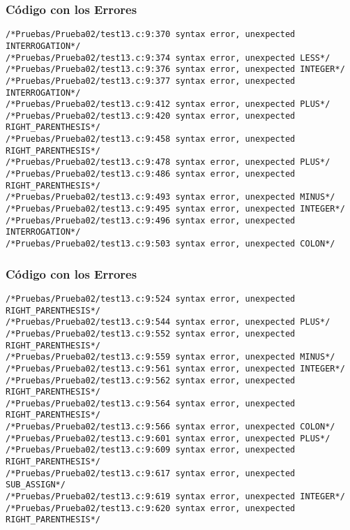 \documentclass{beamer}
\begin{document}
\begin{frame}[fragile]
\frametitle{C\'odigo con los Errores}
\begin{verbatim}
/*Pruebas/Prueba02/test13.c:9:370 syntax error, unexpected INTERROGATION*/
/*Pruebas/Prueba02/test13.c:9:374 syntax error, unexpected LESS*/
/*Pruebas/Prueba02/test13.c:9:376 syntax error, unexpected INTEGER*/
/*Pruebas/Prueba02/test13.c:9:377 syntax error, unexpected INTERROGATION*/
/*Pruebas/Prueba02/test13.c:9:412 syntax error, unexpected PLUS*/
/*Pruebas/Prueba02/test13.c:9:420 syntax error, unexpected RIGHT_PARENTHESIS*/
/*Pruebas/Prueba02/test13.c:9:458 syntax error, unexpected RIGHT_PARENTHESIS*/
/*Pruebas/Prueba02/test13.c:9:478 syntax error, unexpected PLUS*/
/*Pruebas/Prueba02/test13.c:9:486 syntax error, unexpected RIGHT_PARENTHESIS*/
/*Pruebas/Prueba02/test13.c:9:493 syntax error, unexpected MINUS*/
/*Pruebas/Prueba02/test13.c:9:495 syntax error, unexpected INTEGER*/
/*Pruebas/Prueba02/test13.c:9:496 syntax error, unexpected INTERROGATION*/
/*Pruebas/Prueba02/test13.c:9:503 syntax error, unexpected COLON*/
\end{verbatim}
\end{frame}
\begin{frame}[fragile]
\frametitle{C\'odigo con los Errores}
\begin{verbatim}
/*Pruebas/Prueba02/test13.c:9:524 syntax error, unexpected RIGHT_PARENTHESIS*/
/*Pruebas/Prueba02/test13.c:9:544 syntax error, unexpected PLUS*/
/*Pruebas/Prueba02/test13.c:9:552 syntax error, unexpected RIGHT_PARENTHESIS*/
/*Pruebas/Prueba02/test13.c:9:559 syntax error, unexpected MINUS*/
/*Pruebas/Prueba02/test13.c:9:561 syntax error, unexpected INTEGER*/
/*Pruebas/Prueba02/test13.c:9:562 syntax error, unexpected RIGHT_PARENTHESIS*/
/*Pruebas/Prueba02/test13.c:9:564 syntax error, unexpected RIGHT_PARENTHESIS*/
/*Pruebas/Prueba02/test13.c:9:566 syntax error, unexpected COLON*/
/*Pruebas/Prueba02/test13.c:9:601 syntax error, unexpected PLUS*/
/*Pruebas/Prueba02/test13.c:9:609 syntax error, unexpected RIGHT_PARENTHESIS*/
/*Pruebas/Prueba02/test13.c:9:617 syntax error, unexpected SUB_ASSIGN*/
/*Pruebas/Prueba02/test13.c:9:619 syntax error, unexpected INTEGER*/
/*Pruebas/Prueba02/test13.c:9:620 syntax error, unexpected RIGHT_PARENTHESIS*/
\end{verbatim}
\end{frame}
\end{document}
